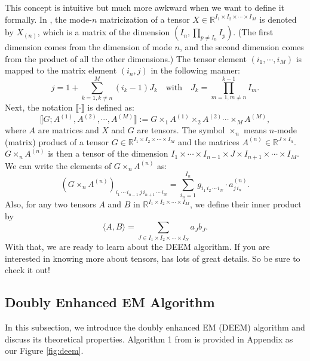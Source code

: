 \documentclass[11pt]{article}
\begin{document}
This concept is intuitive but much more awkward when we want to define it formally. In \cite{kolda2009review}, the mode-$n$ matricization of a tensor $X \in \mathbb{R}^{I_1 \times I_2 \times \cdots \times I_M}$ is denoted by $X_{(n)}$, which is a matrix of the dimension $(I_n, \prod_{p \ne I_n} I_p)$. (The first dimension comes from the dimension of mode $n$, and the second dimension comes from the product of all the other dimensions.) The tensor element $(i_1, \cdots, i_M)$ is mapped to the matrix element $(i_n, j)$ in the following manner: 
\begin{equation*}
    j = 1 + \sum_{k=1,k\ne n}^M (i_k - 1) J_k \quad \text{with} \quad J_k = \prod_{m=1,m \ne n}^{k-1} I_m.
\end{equation*}
Next, the notation $\llbracket \cdot \rrbracket$ is defined as: 
\begin{equation*}
    \llbracket G; A^{(1)}, A^{(2)}, \cdots, A^{(M)} \rrbracket := G \times_1 A^{(1)} \times_2 A^{(2)} 
    \cdots 
    \times_M A^{(M)},
\end{equation*}
where $A$ are matrices and $X$ and $G$ are tensors. The symbol $\times_n$ means $n$-mode (matrix) product of a tensor $G \in \mathbb{R}^{I_1 \times I_2 \times \cdots \times I_M}$ and the matrices $A^{(n)} \in \mathbb{R}^{J \times I_n}$. $G \times_n A^{(n)}$ is then a tensor of the dimension $I_1 \times \cdots \times I_{n-1} \times J \times I_{n+1} \times \cdots \times I_M$. We can write the elements of $G \times_n A^{(n)}$ as:
\begin{equation*}
    (G \times_n A^{(n)})_{i_1 \, \cdots \, i_{n-1} \, j  \, i_{n+1} \, \cdots \, i_N} = \sum_{i_n = 1}^{I_n} g_{i_1 \, i_2 \, \cdots \, i_N} \cdot a^{(n)}_{j\, i_n}.  
\end{equation*}
Also, for any two tensors $A$ and $B$ in $\mathbb{R}^{I_1 \times I_2 \times \cdots \times I_M}$, we define their inner product by
\begin{equation*}
    \langle A , B \rangle = \sum_{J\in I_1\times I_2 \times \cdots \times I_N} a_J b_J.
\end{equation*}
With that, we are ready to learn about the DEEM algorithm. If you are interested in knowing more about tensors, \cite{kolda2009review} has lots of great details. So be sure to check it out! 

\subsection{Doubly Enhanced EM Algorithm}
In this subsection, we introduce the doubly enhanced EM (DEEM) algorithm and discuss its theoretical properties. Algorithm 1 from \cite{mai2022DEEM} is provided in Appendix as our Figure \ref{fig:deem}.
\end{document}
